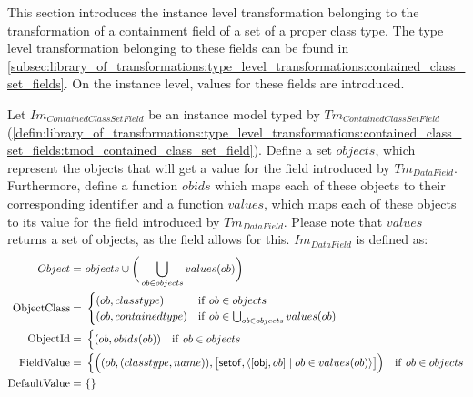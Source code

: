 This section introduces the instance level transformation belonging to the transformation of a containment field of a set of a proper class type. The type level transformation belonging to these fields can be found in \cref{subsec:library_of_transformations:type_level_transformations:contained_class_set_fields}. On the instance level, values for these fields are introduced.

\begin{defin}
\label{defin:library_of_transformations:instance_level_transformations:contained_class_set_field_values:imod_contained_class_set_field}
Let $Im_{ContainedClassSetField}$ be an instance model typed by $Tm_{ContainedClassSetField}$ (\cref{defin:library_of_transformations:type_level_transformations:contained_class_set_fields:tmod_contained_class_set_field}). Define a set $objects$, which represent the objects that will get a value for the field introduced by $Tm_{DataField}$. Furthermore, define a function $obids$ which maps each of these objects to their corresponding identifier and a function $values$, which maps each of these objects to its value for the field introduced by $Tm_{DataField}$. Please note that $values$ returns a set of objects, as the field allows for this. $Im_{DataField}$ is defined as:
\begin{align*}
Object =\ &objects \cup \bigg(\bigcup_{ob \in objects} values(ob)\bigg)\\
\mathrm{ObjectClass} =\ & \begin{cases}
    (ob, classtype) & \mathrm{if }\ ob \in objects\\
    (ob, containedtype) & \mathrm{if }\ ob \in \bigcup_{ob \in objects} values(ob)
\end{cases}\\
\mathrm{ObjectId} =\ & \begin{cases}
    (ob, obids(ob)) & \mathrm{if }\ ob \in objects
\end{cases}\\
\mathrm{FieldValue} =\ & \begin{cases}
    \Big((ob, (classtype, name)), \big[\mathsf{setof}, \langle [\mathsf{obj}, ob] \mid ob \in values(ob) \rangle\big]\Big) & \mathrm{if }\ ob \in objects
\end{cases} \\
\mathrm{DefaultValue} =\ & \{\}
\end{align*}
\end{defin}

